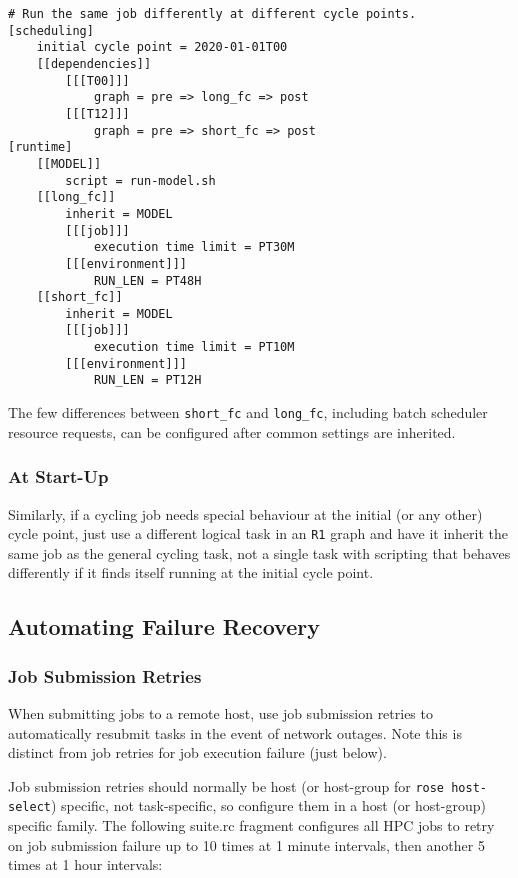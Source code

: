 \lstset{language=suiterc}
\begin{lstlisting}
# Run the same job differently at different cycle points.
[scheduling]
    initial cycle point = 2020-01-01T00
    [[dependencies]]
        [[[T00]]]
            graph = pre => long_fc => post
        [[[T12]]]
            graph = pre => short_fc => post
[runtime]
    [[MODEL]]
        script = run-model.sh
    [[long_fc]]
        inherit = MODEL
        [[[job]]]
            execution time limit = PT30M
        [[[environment]]]
            RUN_LEN = PT48H
    [[short_fc]]
        inherit = MODEL
        [[[job]]]
            execution time limit = PT10M
        [[[environment]]]
            RUN_LEN = PT12H
\end{lstlisting}

The few differences between \lstinline=short_fc= and \lstinline=long_fc=,
including batch scheduler resource requests, can be configured after common
settings are inherited.

\subsubsection{At Start-Up}

Similarly, if a cycling job needs special behaviour at the initial (or any other)
cycle point, just use a different logical task in an \lstinline=R1= graph and
have it inherit the same job as the general cycling task, not a single task
with scripting that behaves differently if it finds itself running at the
initial cycle point.

\subsection{Automating Failure Recovery}

\subsubsection{Job Submission Retries}

When submitting jobs to a remote host, use job submission retries to
automatically resubmit tasks in the event of network outages. Note this is
distinct from job retries for job execution failure (just below).

Job submission retries should normally be host (or host-group for
\lstinline=rose host-select=) specific, not task-specific, so configure them in
a host (or host-group) specific family. The following suite.rc fragment
configures all HPC jobs to retry on job submission failure up to 10
times at 1 minute intervals, then another 5 times at 1 hour intervals:

